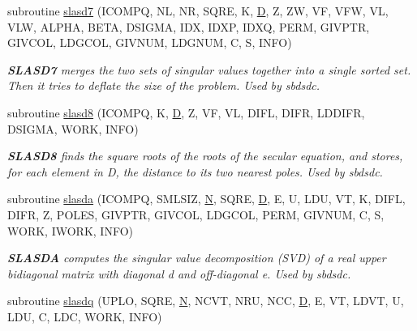 \begin{DoxyCompactItemize}
subroutine \hyperlink{group__auxOTHERauxiliary_ga506889eb5029bb8325b9b2ac02a62bce}{slasd7} (I\+C\+O\+M\+P\+Q, N\+L, N\+R, S\+Q\+R\+E, K, \hyperlink{odrpack_8h_a7dae6ea403d00f3687f24a874e67d139}{D}, Z, Z\+W, V\+F, V\+F\+W, V\+L, V\+L\+W, A\+L\+P\+H\+A, B\+E\+T\+A, D\+S\+I\+G\+M\+A, I\+D\+X, I\+D\+X\+P, I\+D\+X\+Q, P\+E\+R\+M, G\+I\+V\+P\+T\+R, G\+I\+V\+C\+O\+L, L\+D\+G\+C\+O\+L, G\+I\+V\+N\+U\+M, L\+D\+G\+N\+U\+M, C, S, I\+N\+F\+O)
\begin{DoxyCompactList}\small\item\em {\bfseries S\+L\+A\+S\+D7} merges the two sets of singular values together into a single sorted set. Then it tries to deflate the size of the problem. Used by sbdsdc. \end{DoxyCompactList}\item 
subroutine \hyperlink{group__auxOTHERauxiliary_gac4e0b8da65a5d9493e17f46cd010e6cc}{slasd8} (I\+C\+O\+M\+P\+Q, K, \hyperlink{odrpack_8h_a7dae6ea403d00f3687f24a874e67d139}{D}, Z, V\+F, V\+L, D\+I\+F\+L, D\+I\+F\+R, L\+D\+D\+I\+F\+R, D\+S\+I\+G\+M\+A, W\+O\+R\+K, I\+N\+F\+O)
\begin{DoxyCompactList}\small\item\em {\bfseries S\+L\+A\+S\+D8} finds the square roots of the roots of the secular equation, and stores, for each element in D, the distance to its two nearest poles. Used by sbdsdc. \end{DoxyCompactList}\item 
subroutine \hyperlink{group__auxOTHERauxiliary_gafe52aa918bfa2a863f122f39ae9e6404}{slasda} (I\+C\+O\+M\+P\+Q, S\+M\+L\+S\+I\+Z, \hyperlink{polmisc_8c_a0240ac851181b84ac374872dc5434ee4}{N}, S\+Q\+R\+E, \hyperlink{odrpack_8h_a7dae6ea403d00f3687f24a874e67d139}{D}, E, U, L\+D\+U, V\+T, K, D\+I\+F\+L, D\+I\+F\+R, Z, P\+O\+L\+E\+S, G\+I\+V\+P\+T\+R, G\+I\+V\+C\+O\+L, L\+D\+G\+C\+O\+L, P\+E\+R\+M, G\+I\+V\+N\+U\+M, C, S, W\+O\+R\+K, I\+W\+O\+R\+K, I\+N\+F\+O)
\begin{DoxyCompactList}\small\item\em {\bfseries S\+L\+A\+S\+D\+A} computes the singular value decomposition (S\+V\+D) of a real upper bidiagonal matrix with diagonal d and off-\/diagonal e. Used by sbdsdc. \end{DoxyCompactList}\item 
subroutine \hyperlink{group__auxOTHERauxiliary_gabb4a455a53f317631c56b07d4828eb28}{slasdq} (U\+P\+L\+O, S\+Q\+R\+E, \hyperlink{polmisc_8c_a0240ac851181b84ac374872dc5434ee4}{N}, N\+C\+V\+T, N\+R\+U, N\+C\+C, \hyperlink{odrpack_8h_a7dae6ea403d00f3687f24a874e67d139}{D}, E, V\+T, L\+D\+V\+T, U, L\+D\+U, C, L\+D\+C, W\+O\+R\+K, I\+N\+F\+O)

\end{DoxyCompactItemize}
